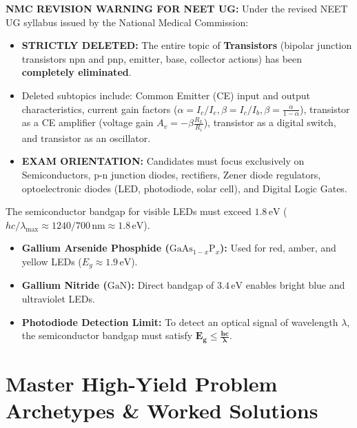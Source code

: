 \documentclass[10pt,a4paper]{article}
\begin{document}
\begin{trapbox}
\textbf{NMC REVISION WARNING FOR NEET UG:}
Under the revised NEET UG syllabus issued by the National Medical Commission:
\begin{itemize}
  \item \textbf{STRICTLY DELETED:} The entire topic of \textbf{Transistors} (bipolar junction transistors npn and pnp, emitter, base, collector actions) has been \textbf{completely eliminated}.
  \item Deleted subtopics include: Common Emitter (CE) input and output characteristics, current gain factors ($\alpha = I_c/I_e, \beta = I_c/I_b, \beta = \frac{\alpha}{1-\alpha}$), transistor as a CE amplifier (voltage gain $A_v = -\beta \frac{R_L}{R_i}$), transistor as a digital switch, and transistor as an oscillator.
  \item \textbf{EXAM ORIENTATION:} Candidates must focus exclusively on Semiconductors, p-n junction diodes, rectifiers, Zener diode regulators, optoelectronic diodes (LED, photodiode, solar cell), and Digital Logic Gates.
\end{itemize}
\end{trapbox}

\begin{ncertbox}
The semiconductor bandgap for visible LEDs must exceed $1.8\,\mathrm{eV}$ ($hc/\lambda_{\max} \approx 1240 / 700\,\mathrm{nm} \approx 1.8\,\mathrm{eV}$).
\begin{itemize}
  \item \textbf{Gallium Arsenide Phosphide ($\mathrm{GaAs}_{1-x}\mathrm{P}_x$):} Used for red, amber, and yellow LEDs ($E_g \approx 1.9\,\mathrm{eV}$).
  \item \textbf{Gallium Nitride ($\mathrm{GaN}$):} Direct bandgap of $3.4\,\mathrm{eV}$ enables bright blue and ultraviolet LEDs.
  \item \textbf{Photodiode Detection Limit:} To detect an optical signal of wavelength $\lambda$, the semiconductor bandgap must satisfy $\mathbf{E_g \le \frac{hc}{\lambda}}$.
\end{itemize}
\end{ncertbox}

\section{Master High-Yield Problem Archetypes \& Worked Solutions}
\end{document}
